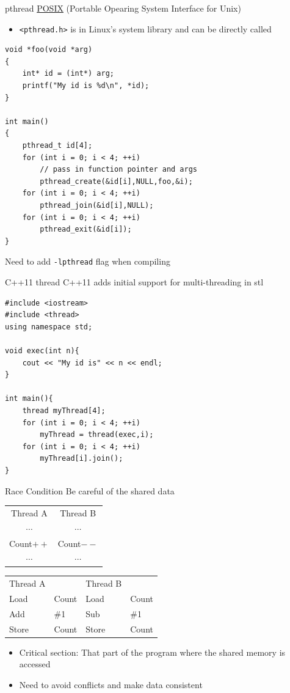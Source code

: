 \documentclass{../TexTemplate/myslide}
\begin{document}
\begin{frame}[fragile]{pthread}
\href{https://en.wikipedia.org/wiki/POSIX_Threads}{POSIX} (Portable Opearing System Interface for Unix)
\begin{itemize}
\item \verb'<pthread.h>' is in Linux's system library and can be directly called
\end{itemize}
\begin{lstlisting}[basicstyle=\scriptsize]
void *foo(void *arg)
{
	int* id = (int*) arg;
	printf("My id is %d\n", *id);
}

int main()
{
	pthread_t id[4];
	for (int i = 0; i < 4; ++i)
		// pass in function pointer and args
		pthread_create(&id[i],NULL,foo,&i);
	for (int i = 0; i < 4; ++i)
		pthread_join(&id[i],NULL);
	for (int i = 0; i < 4; ++i)
		pthread_exit(&id[i]);
}
\end{lstlisting}
Need to add \verb'-lpthread' flag when compiling
\end{frame}

\begin{frame}[fragile]{C++11 thread}
C++11 adds initial support for multi-threading in stl
\begin{lstlisting}
#include <iostream>
#include <thread>
using namespace std;

void exec(int n){
	cout << "My id is" << n << endl;
}

int main(){
	thread myThread[4];
	for (int i = 0; i < 4; ++i)
		myThread = thread(exec,i);
	for (int i = 0; i < 4; ++i)
		myThread[i].join();
}
\end{lstlisting}
\end{frame}

\begin{frame}{Race Condition}
Be careful of the shared data
\begin{center}
\begin{tabular}{c|c}
Thread A & Thread B\\
$\cdots$ & $\cdots$\\
Count$++$ & Count$--$\\
$\cdots$ & $\cdots$
\end{tabular}\quad
\begin{tabular}{ll|ll}
Thread A & & Thread B\\
Load & Count & Load & Count\\
Add & \#1 & Sub & \#1\\
Store & Count & Store & Count
\end{tabular}
\end{center}
\begin{itemize}
	\item Critical section: That part of the program where the shared memory is accessed
	\item Need to avoid conflicts and make data consistent
\end{itemize}
\end{frame}
\end{document}
